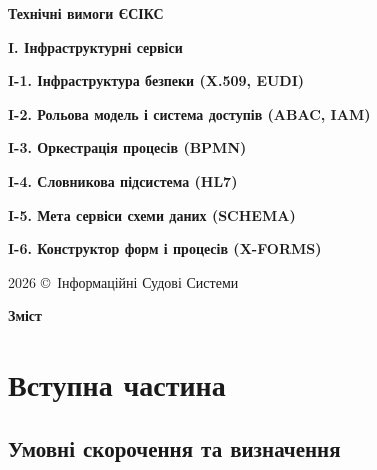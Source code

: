 \documentclass{article}
\newcommand\HUGE[1]{\fontsize{40}{40}\selectfont #1}
\begin{document}
\pagestyle{fancy}

\begin{titlepage}
  \AddToShipoutPictureBG*{\AtPageLowerLeft{\color{nato}\rule{\paperwidth}{\paperheight}}}
  \color{white}\thispagestyle{empty}\vspace*{4cm}\centering
  {\Huge  \textbf{Технічні вимоги ЄСІКС} \par} \vspace{2cm}
  {\HUGE  \textbf{I. Інфраструктурні сервіси} \par} \vspace{2.5cm}
  {\LARGE \textbf{I-1. Інфраструктура безпеки (X.509, EUDI)} \par}
  {\LARGE \textbf{I-2. Рольова модель і система доступів (ABAC, IAM) } \par}
  {\LARGE \textbf{I-3. Оркестрація процесів (BPMN)} \par}
  {\LARGE \textbf{I-4. Словникова підсистема (HL7)} \par}
  {\LARGE \textbf{I-5. Мета сервіси схеми даних (SCHEMA)} \par}
  {\LARGE \textbf{I-6. Конструктор форм і процесів (X-FORMS)} \par} \vspace{2.5cm}
  \vfill
  {\large 2026 \copyright\ Інформаційні Судові Системи \par}
\end{titlepage}

\newpage

\begin{center}
  {\Huge\color{nato}\bfseries Зміст\par}
\end{center}
\vspace{40pt}
\tableofcontents

\begin{abstract}
ТЕХНІЧНІ ВИМОГИ
НА СТВОРЕННЯ ЗАСОБУ ІНФОРМАТИЗАЦІЇ - КОМПОНЕНТІВ “КЕРУВАННЯ ДОСТУПОМ”, БАЗОВИХ, БІЗНЕС СЕРВІСІВ ТА ІНФРАСТРУКТУРИ
ЄДИНОЇ СУДОВОЇ ІНФОРМАЦІЙНО-КОМУНІКАЦІЙНОЇ СИСТЕМИ.
\end{abstract}

\newpage
\section*{Вступна частина}

\subsection*{Умовні скорочення та визначення}
\end{document}
